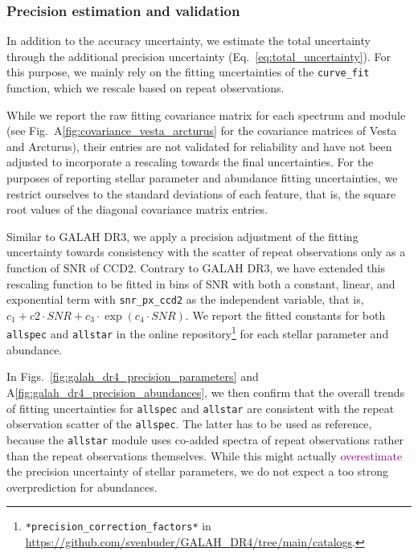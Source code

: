 \documentclass[
  journal=pasa,
  manuscript=research-paper, %
  year=2024,
  volume=37
]{cup-journal}
\newcommand{\adjusted}[1]{{\textcolor{purple}{#1}}}
\begin{document}
\subsubsection{Precision estimation and validation} \label{sec:uncertainty_precision}

In addition to the accuracy uncertainty, we estimate the total uncertainty through the additional precision uncertainty (Eq.~\ref{eq:total_uncertainty}). For this purpose, we mainly rely on the fitting uncertainties of the \texttt{curve\_fit} function, which we rescale based on repeat observations.

While we report the raw fitting covariance matrix for each spectrum and module (see Fig.~A\ref{fig:covariance_vesta_arcturus} for the covariance matrices of Vesta and Arcturus), their entries are not validated for reliability and have not been adjusted to incorporate a rescaling towards the final uncertainties. For the purposes of reporting stellar parameter and abundance fitting uncertainties, we restrict ourselves to the standard deviations of each feature, that is, the square root values of the diagonal covariance matrix entries.

Similar to GALAH DR3, we apply a precision adjustment of the fitting uncertainty towards consistency with the scatter of repeat observations only as a function of SNR of CCD2. Contrary to GALAH DR3, we have extended this rescaling function to be fitted in bins of SNR with both a constant, linear, and exponential term with \texttt{snr\_px\_ccd2} as the independent variable, that is, $c_1 + c2 \cdot SNR + c_3 \cdot \exp(c_4 \cdot SNR)$. We report the fitted constants for both \texttt{allspec} and \texttt{allstar} in the online repository\footnote{\texttt{*precision\_correction\_factors*} in \url{https://github.com/svenbuder/GALAH_DR4/tree/main/catalogs}.} for each stellar parameter and abundance. 

In Figs.~\ref{fig:galah_dr4_precision_parameters} and A\ref{fig:galah_dr4_precision_abundances}, we then confirm that the overall trends of fitting uncertainties for \texttt{allspec} and \texttt{allstar} are consistent with the repeat observation scatter of the \texttt{allspec}. The latter has to be used as reference, because the \texttt{allstar} module uses co-added spectra of repeat observations rather than the repeat observations themselves. While this might actually \adjusted{overestimate} the precision uncertainty of stellar parameters, we do not expect a too strong overprediction for abundances.
\end{document}
